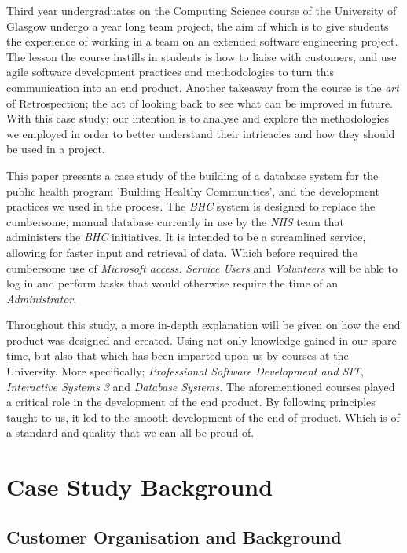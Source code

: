\documentclass{l3proj}
\begin{document}
Third year undergraduates on the Computing Science course of the University of Glasgow undergo a year long team project, the aim of which is to give students the experience of working in a team on an extended software engineering project. The lesson the course instills in students is how to liaise with customers, and use agile software development practices and methodologies to turn this communication into an end product. Another takeaway from the course is the \textit{art} of Retrospection; the act of looking back to see what can be improved in future. With this case study; our intention is to analyse and explore the methodologies we employed in order to better understand their intricacies and how they should be used in a project.

This paper presents a case study of the building of a database system for the public health program 'Building Healthy Communities', and the development practices we used in the process. The \textit{BHC} system is designed to replace the cumbersome, manual database currently in use by the \textit{NHS} team that administers the \textit{BHC} initiatives. It is intended to be a streamlined service, allowing for faster input and retrieval of data. Which before required the cumbersome use of \textit{Microsoft access.} \textit{Service Users} and \textit{Volunteers} will be able to log in and perform tasks that would otherwise require the time of an \textit{Administrator.}

Throughout this study, a more in-depth explanation will be given on how the end product was designed and created. Using not only knowledge gained in our spare time, but also that which has been imparted upon us by courses at the University. More specifically; \textit{Professional Software Development and SIT}, \textit{Interactive Systems 3} and \textit{Database Systems.} The aforementioned courses played a critical role in the development of the end product. By following principles taught to us, it led to the smooth development of the end of product. Which is of a standard and quality that we can all be proud of.
\section{Case Study Background}

\subsection{Customer Organisation and Background}
\label{customer}
\end{document}
